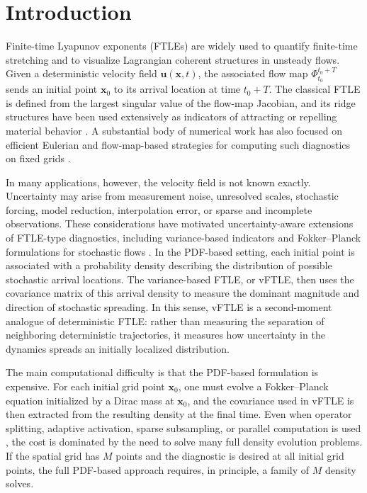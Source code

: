 \documentclass[a4paper,11pt]{article}
\numberwithin{equation}{section}
\theoremstyle{plain}
\theoremstyle{definition}
\theoremstyle{remark}
\newcommand{\bx}{\mathbf{x}}
\newcommand{\bu}{\mathbf{u}}
\begin{document}
\section{Introduction}

Finite-time Lyapunov exponents (FTLEs) are widely used to quantify finite-time stretching and to visualize Lagrangian coherent structures in unsteady flows.  Given a deterministic velocity field \(\bu(\bx,t)\), the associated flow map \(\Phi_{t_0}^{t_0+T}\) sends an initial point \(\bx_0\) to its arrival location at time \(t_0+T\).  The classical FTLE is defined from the largest singular value of the flow-map Jacobian, and its ridge structures have been used extensively as indicators of attracting or repelling material behavior \cite{halyua00,hal01,hal02,shalekmar05,hal15}.  A substantial body of numerical work has also focused on efficient Eulerian and flow-map-based strategies for computing such diagnostics on fixed grids \cite{leu11,leu13,youleu18,youleu20,lywn19}.

In many applications, however, the velocity field is not known exactly.  Uncertainty may arise from measurement noise, unresolved scales, stochastic forcing, model reduction, interpolation error, or sparse and incomplete observations.  These considerations have motivated uncertainty-aware extensions of FTLE-type diagnostics, including variance-based indicators and Fokker--Planck formulations for stochastic flows \cite{sfrs12,youleu21}.  In the PDF-based setting, each initial point is associated with a probability density describing the distribution of possible stochastic arrival locations.  The variance-based FTLE, or vFTLE, then uses the covariance matrix of this arrival density to measure the dominant magnitude and direction of stochastic spreading.  In this sense, vFTLE is a second-moment analogue of deterministic FTLE: rather than measuring the separation of neighboring deterministic trajectories, it measures how uncertainty in the dynamics spreads an initially localized distribution.

The main computational difficulty is that the PDF-based formulation is expensive.  For each initial grid point \(\bx_0\), one must evolve a Fokker--Planck equation initialized by a Dirac mass at \(\bx_0\), and the covariance used in vFTLE is then extracted from the resulting density at the final time.  Even when operator splitting, adaptive activation, sparse subsampling, or parallel computation is used \cite{ngyouleu22}, the cost is dominated by the need to solve many full density evolution problems.  If the spatial grid has \(M\) points and the diagnostic is desired at all initial grid points, the full PDF-based approach requires, in principle, a family of \(M\) density solves.
\end{document}
